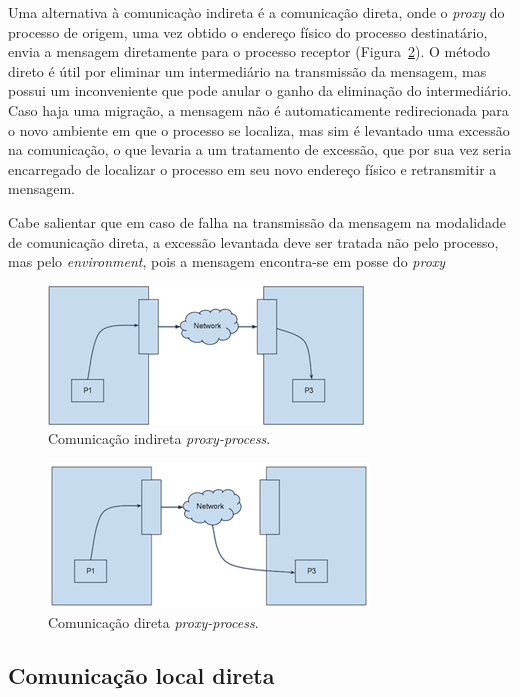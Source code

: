 Uma alternativa à comunicaçào indireta é a comunicação direta, onde o \textit{proxy} do processo de origem, uma vez obtido o endereço físico do processo destinatário, envia a mensagem diretamente para o processo receptor (Figura~\ref{fig:direta}). O método direto é útil por eliminar um intermediário na transmissão da mensagem, mas possui um inconveniente que pode anular o ganho da eliminação do intermediário. Caso haja uma migração, a mensagem não é automaticamente redirecionada para o novo ambiente em que o processo se localiza, mas sim é levantado uma excessão na comunicação, o que levaria a um tratamento de excessão, que por sua vez seria encarregado de localizar o processo em seu novo endereço físico e retransmitir a mensagem.

Cabe salientar que em caso de falha na transmissão da mensagem na modalidade de comunicação direta, a excessão levantada deve ser tratada não pelo processo, mas pelo \textit{environment}, pois a mensagem encontra-se em posse do \textit{proxy}

\begin{figure}
  \centerline{\includegraphics{Communication_indireta.png}}
  \caption{Comunicação indireta \textit{proxy-process}.}
\label{fig:indireta}
\end{figure}

\begin{figure}
  \centerline{\includegraphics{Communication_direta.png}}
  \caption{Comunicação direta \textit{proxy-process}.}
\label{fig:direta}
\end{figure}

\subsection{Comunicação local direta}

